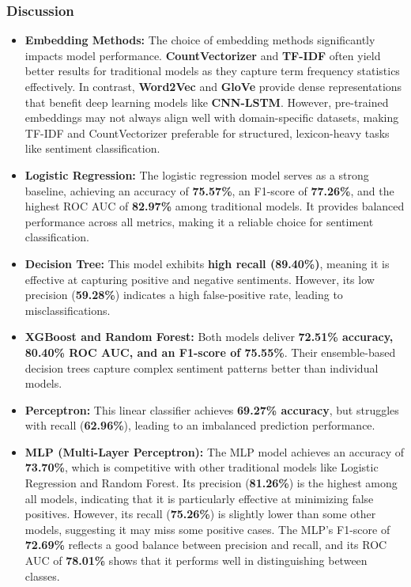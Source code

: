 \subsubsection{Discussion}

\begin{itemize}
    \item \textbf{Embedding Methods:} The choice of embedding methods significantly impacts model performance. 
    \textbf{CountVectorizer} and \textbf{TF-IDF} often yield better results for traditional models as they capture term frequency statistics effectively. 
    In contrast, \textbf{Word2Vec} and \textbf{GloVe} provide dense representations that benefit deep learning models like \textbf{CNN-LSTM}. 
    However, pre-trained embeddings may not always align well with domain-specific datasets, making TF-IDF and CountVectorizer preferable for structured, lexicon-heavy tasks like sentiment classification.

    \item \textbf{Logistic Regression:} The logistic regression model serves as a strong baseline, achieving an accuracy of \textbf{75.57\%}, an F1-score of \textbf{77.26\%}, and the highest ROC AUC of \textbf{82.97\%} among traditional models. It provides balanced performance across all metrics, making it a reliable choice for sentiment classification.

    \item \textbf{Decision Tree:} This model exhibits \textbf{high recall (89.40\%)}, meaning it is effective at capturing positive and negative sentiments. However, its low precision (\textbf{59.28\%}) indicates a high false-positive rate, leading to misclassifications.

    \item \textbf{XGBoost and Random Forest:} Both models deliver \textbf{72.51\% accuracy, 80.40\% ROC AUC, and an F1-score of 75.55\%}. Their ensemble-based decision trees capture complex sentiment patterns better than individual models.

    \item \textbf{Perceptron:} This linear classifier achieves \textbf{69.27\% accuracy}, but struggles with recall (\textbf{62.96\%}), leading to an imbalanced prediction performance.
    
    \item \textbf{MLP (Multi-Layer Perceptron):}  
    The MLP model achieves an accuracy of \textbf{73.70\%}, which is competitive with other traditional models like Logistic Regression and Random Forest. Its precision (\textbf{81.26\%}) is the highest among all models, indicating that it is particularly effective at minimizing false positives. However, its recall (\textbf{75.26\%}) is slightly lower than some other models, suggesting it may miss some positive cases. The MLP's F1-score of \textbf{72.69\%} reflects a good balance between precision and recall, and its ROC AUC of \textbf{78.01\%} shows that it performs well in distinguishing between classes.


\end{itemize}
